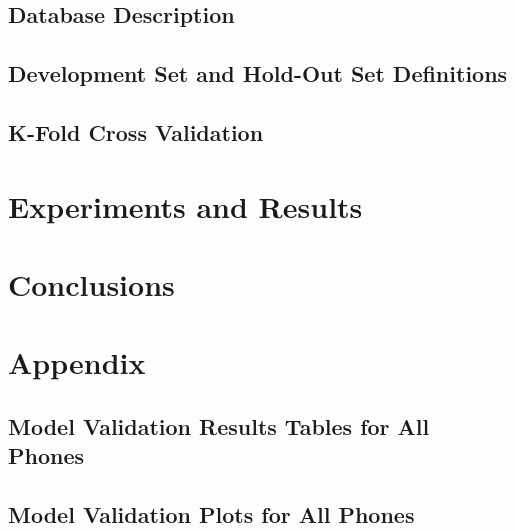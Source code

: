 \documentclass[11pt,a4paper]{tesis}
\begin{document}
		\section{Database Description}
			
		\section{Development Set and Hold-Out Set Definitions}
			
		\section{K-Fold Cross Validation}
			

	\chapter{Experiments and Results}
		

	\chapter{Conclusions}
		
		

	\chapter{Appendix}
		
		\section{Model Validation Results Tables for All Phones} \label{section:tables}
			
		\section{Model Validation Plots for All Phones} \label{section:plots}
			

	\printbibliography
\end{document}
